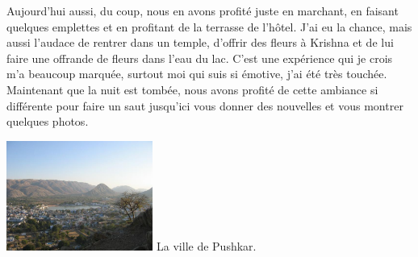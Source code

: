 \begin{multicols}{2}
Aujourd'hui aussi, du coup, nous en avons profité juste en marchant, en faisant quelques emplettes et en profitant de la terrasse de l'hôtel. J'ai eu la chance, mais aussi l'audace de rentrer dans un temple, d'offrir des fleurs à Krishna et de lui faire une offrande de fleurs dans l'eau du lac. C'est une expérience qui je crois m'a beaucoup marquée, surtout moi qui suis si émotive, j'ai été très touchée.  Maintenant que la nuit est tombée, nous avons profité de cette ambiance si différente pour faire un saut jusqu'ici vous donner des nouvelles et vous montrer quelques photos.

\hspace*{-0.65cm}
\includegraphics[width=4.8cm]{articles/Journees-zen/pushkar.jpg}
La ville de Pushkar.

\end{multicols}


